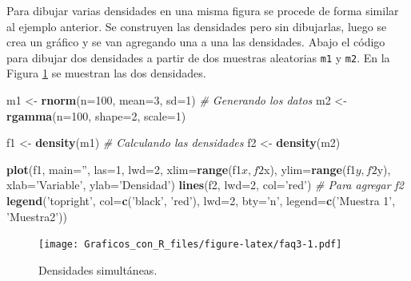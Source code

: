 \documentclass[10pt,]{krantz}
\makeatletter
\newenvironment{Shaded}{\begin{snugshade}}{\end{snugshade}}
\newcommand{\KeywordTok}[1]{\textcolor[rgb]{0.13,0.29,0.53}{\textbf{{#1}}}}
\newcommand{\DataTypeTok}[1]{\textcolor[rgb]{0.13,0.29,0.53}{{#1}}}
\newcommand{\DecValTok}[1]{\textcolor[rgb]{0.00,0.00,0.81}{{#1}}}
\newcommand{\StringTok}[1]{\textcolor[rgb]{0.31,0.60,0.02}{{#1}}}
\newcommand{\CommentTok}[1]{\textcolor[rgb]{0.56,0.35,0.01}{\textit{{#1}}}}
\newcommand{\NormalTok}[1]{{#1}}
\newenvironment{kframe}{%
\medskip{}
\setlength{\fboxsep}{.8em}
 \def\at@end@of@kframe{}%
 \ifinner\ifhmode%
  \def\at@end@of@kframe{\end{minipage}}%
  \begin{minipage}{\columnwidth}%
 \fi\fi%
 \def\FrameCommand##1{\hskip\@totalleftmargin \hskip-\fboxsep
 \colorbox{shadecolor}{##1}\hskip-\fboxsep
     \hskip-\linewidth \hskip-\@totalleftmargin \hskip\columnwidth}%
 \MakeFramed {\advance\hsize-\width
   \@totalleftmargin\z@ \linewidth\hsize
   \@setminipage}}%
 {\par\unskip\endMakeFramed%
 \at@end@of@kframe}
\renewenvironment{Shaded}{\begin{kframe}}{\end{kframe}}
\makeatother
\begin{document}
Para dibujar varias densidades en una misma figura se procede de forma
similar al ejemplo anterior. Se construyen las densidades pero sin
dibujarlas, luego se crea un gráfico y se van agregando una a una las
densidades. Abajo el código para dibujar dos densidades a partir de dos
muestras aleatorias \texttt{m1} y \texttt{m2}. En la Figura
\ref{fig:faq3} se muestran las dos densidades.

\begin{Shaded}
\begin{Highlighting}[]
\NormalTok{m1 <-}\StringTok{ }\KeywordTok{rnorm}\NormalTok{(}\DataTypeTok{n=}\DecValTok{100}\NormalTok{, }\DataTypeTok{mean=}\DecValTok{3}\NormalTok{, }\DataTypeTok{sd=}\DecValTok{1}\NormalTok{)        }\CommentTok{# Generando los datos}
\NormalTok{m2 <-}\StringTok{ }\KeywordTok{rgamma}\NormalTok{(}\DataTypeTok{n=}\DecValTok{100}\NormalTok{, }\DataTypeTok{shape=}\DecValTok{2}\NormalTok{, }\DataTypeTok{scale=}\DecValTok{1}\NormalTok{)}

\NormalTok{f1 <-}\StringTok{ }\KeywordTok{density}\NormalTok{(m1)  }\CommentTok{# Calculando las densidades}
\NormalTok{f2 <-}\StringTok{ }\KeywordTok{density}\NormalTok{(m2)}

\KeywordTok{plot}\NormalTok{(f1, }\DataTypeTok{main=}\StringTok{''}\NormalTok{, }\DataTypeTok{las=}\DecValTok{1}\NormalTok{, }\DataTypeTok{lwd=}\DecValTok{2}\NormalTok{,}
     \DataTypeTok{xlim=}\KeywordTok{range}\NormalTok{(f1$x, f2$x), }\DataTypeTok{ylim=}\KeywordTok{range}\NormalTok{(f1$y, f2$y),}
     \DataTypeTok{xlab=}\StringTok{'Variable'}\NormalTok{, }\DataTypeTok{ylab=}\StringTok{'Densidad'}\NormalTok{)}
\KeywordTok{lines}\NormalTok{(f2, }\DataTypeTok{lwd=}\DecValTok{2}\NormalTok{, }\DataTypeTok{col=}\StringTok{'red'}\NormalTok{)  }\CommentTok{# Para agregar f2}
\KeywordTok{legend}\NormalTok{(}\StringTok{'topright'}\NormalTok{, }\DataTypeTok{col=}\KeywordTok{c}\NormalTok{(}\StringTok{'black'}\NormalTok{, }\StringTok{'red'}\NormalTok{),}
       \DataTypeTok{lwd=}\DecValTok{2}\NormalTok{, }\DataTypeTok{bty=}\StringTok{'n'}\NormalTok{, }\DataTypeTok{legend=}\KeywordTok{c}\NormalTok{(}\StringTok{'Muestra 1'}\NormalTok{, }\StringTok{'Muestra2'}\NormalTok{))}
\end{Highlighting}
\end{Shaded}

\begin{figure}[htbp]
\centering
\texttt{[image: Graficos\_con\_R\_files/figure-latex/faq3-1.pdf]}
\caption{\label{fig:faq3}Densidades simultáneas.}
\end{figure}
\end{document}
